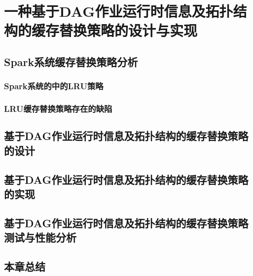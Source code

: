 \chapter{一种基于DAG作业运行时信息及拓扑结构的缓存替换策略的设计与实现}\label{chap:guide}

\section{Spark系统缓存替换策略分析}
\subsection{Spark系统的中的LRU策略}
\subsection{LRU缓存替换策略存在的缺陷}
\section{基于DAG作业运行时信息及拓扑结构的缓存替换策略的设计}
\section{基于DAG作业运行时信息及拓扑结构的缓存替换策略的实现}
\section{基于DAG作业运行时信息及拓扑结构的缓存替换策略测试与性能分析}
\section{本章总结}